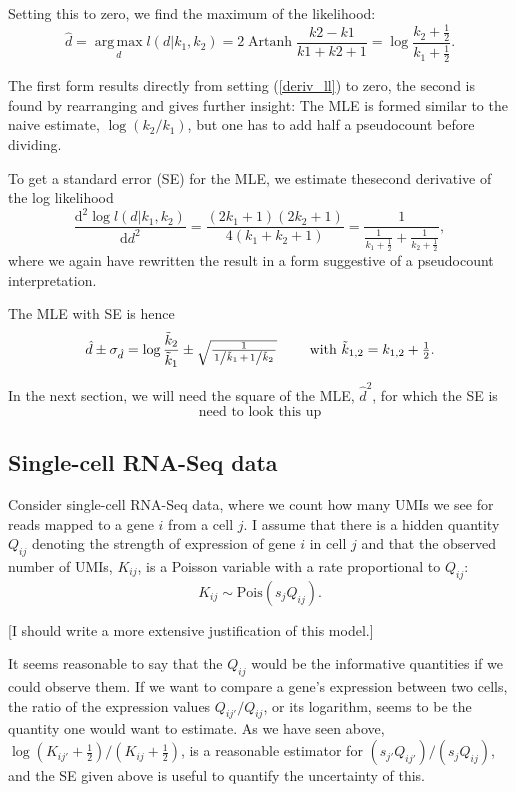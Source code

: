 \documentclass[fleqn]{article}
\begin{document}
Setting this to zero, we find the maximum of the likelihood:
\[ \hat d = \operatorname*{arg\,max}_d  l(d|k_1,k_2) = 2 \operatorname{Artanh} \frac{ k2 - k1 } {  k1 + k2 + 1 }  = \log\frac{k_2+\frac{1}{2} }{ k_1+\frac{1}{2}  }. \]

The first form results directly from setting (\ref{deriv_ll}) to zero, the second is found by rearranging and gives further insight: The MLE is formed similar to the naive estimate, $\log(k_2/k_1)$, but one has to add half a pseudocount before dividing.


To get a standard error (SE) for the MLE, we estimate thesecond derivative of the log likelihood
\[ \frac{\mathrm{d}^2\log l(d|k_1,k_2)}{\mathrm{d}d^2} =  \frac{ ( 2 k_1 + 1 ) ( 2 k_2 + 1 ) }{ 4 (k_1+k_2+1) } = 
\frac{1}{\frac{1}{k_1+\frac{1}{2}} + \frac{1}{k_2+\frac{1}{2}}},\]
where we again have rewritten the result in a form suggestive of a pseudocount interpretation.

The MLE with SE is hence
\[ \hat d \pm \sigma_{\hat d} = \log\frac{\tilde k_2}{ \tilde k_1 }
\pm \textstyle\sqrt{ \frac{1}{\left.1\middle/\tilde k_1\right. + \left.1\middle/\tilde k_2\right.} } \qquad \text{ with } \tilde k_{1,2} = k_{1,2} + \textstyle{\frac{1}{2}}. \]

In the next section, we will need the square of the MLE, $\hat d^ 2$, for which the SE is
\begin{equation} 
\text{need to look this up} \label{d2SE} 
\end{equation}


\subsection*{Single-cell RNA-Seq data}

Consider single-cell RNA-Seq data, where we count how many UMIs we see for reads mapped to a gene $i$ from a cell $j$. I assume that there is a hidden quantity $Q_{ij}$ denoting the strength of expression of gene $i$ in cell $j$ and that the observed number of UMIs, $K_{ij}$, is a Poisson 
variable with a rate proportional to $Q_{ij}$:
\[ K_{ij} \sim \text{Pois}(s_j Q_{ij}). \]

[I should write a more extensive justification of this model.]

It seems reasonable to say that the $Q_{ij}$ would be the informative quantities if we could observe them. If we want to compare a gene's expression between two cells, the ratio of the expression values $Q_{ij'}/Q_{ij}$, or its logarithm, seems to be the quantity one would want to estimate. As we have seen above, $\log (K_{ij'}+\frac{1}{2}) / (K_{ij}+\frac{1}{2})$, is a reasonable estimator for $(s_{j'}Q_{ij'})/(s_{j}Q_{ij})$, and the SE given above is useful to quantify the uncertainty of this.
\end{document}
